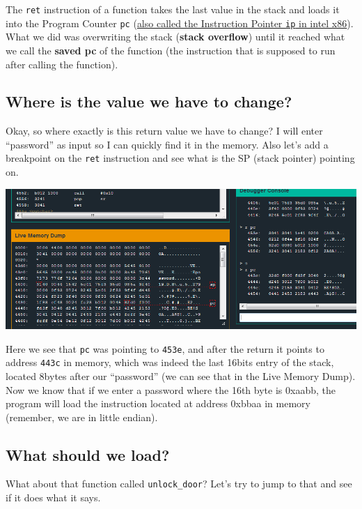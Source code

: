 The \texttt{ret} instruction of a function takes the last value in the
stack and loads it into the Program Counter \texttt{pc}
(\href{http://en.wikipedia.org/wiki/Program_counter}{also called the
Instruction Pointer \texttt{ip} in intel x86}).\\What we did was
overwriting the stack (\textbf{stack overflow}) until it reached what we
call the \textbf{saved pc} of the function (the instruction that is
supposed to run after calling the function).

\subsection{Where is the value we have to
change?}\label{where-is-the-value-we-have-to-change}

Okay, so where exactly is this return value we have to change? I will
enter ``password'' as input so I can quickly find it in the memory. Also
let's add a breakpoint on the \texttt{ret} instruction and see what is
the SP (stack pointer) pointing on.

\includegraphics{img/5_2.PNG}

Here we see that \texttt{pc} was pointing to \texttt{453e}, and after
the return it points to address \texttt{443c} in memory, which was
indeed the last 16bits entry of the stack, located 8bytes after our
``password'' (we can see that in the Live Memory Dump). Now we know that
if we enter a password where the 16th byte is 0xaabb, the program will
load the instruction located at address 0xbbaa in memory (remember, we
are in little endian).

\subsection{What should we load?}\label{what-should-we-load}

What about that function called \texttt{unlock\_door}? Let's try to jump
to that and see if it does what it says.

